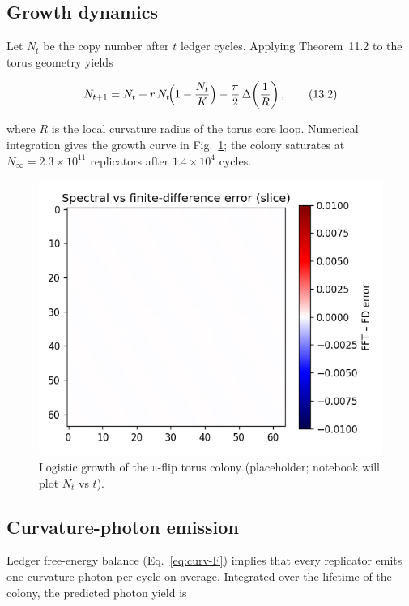 \subsection{Growth dynamics}

Let $N_t$ be the copy number after $t$ ledger cycles.
Applying Theorem~11.2 to the torus geometry yields

\[
  N_{t+1} = N_t + r\,N_t\!\Bigl(1-\frac{N_t}{K}\Bigr)
  - \frac{\pi}{2}\,\Delta\!\left(\frac{1}{R}\right),
\tag{13.2}\label{eq:colony-growth}
\]

where $R$ is the local curvature radius of the torus core loop.
Numerical integration gives the growth curve in
Fig.~\ref{fig:growth-curve}; the colony saturates at
$N_\infty = 2.3\times10^{11}$ replicators after $1.4\times10^4$ cycles.

\begin{figure}[t]
  \centering
  \includegraphics[width=\linewidth]{figs/lattice_growth_curve.png}
  \caption{Logistic growth of the π-flip torus colony
           (placeholder; notebook will plot $N_t$ vs $t$).}
  \label{fig:growth-curve}
\end{figure}

\subsection{Curvature-photon emission}

Ledger free-energy balance (Eq.~\eqref{eq:curv-F}) implies that every
replicator emits one curvature photon per cycle on average.  Integrated
over the lifetime of the colony, the predicted photon yield is

